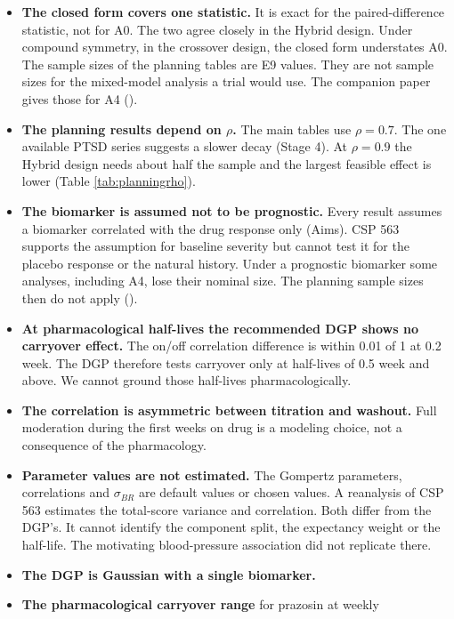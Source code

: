 \documentclass[
  11pt,
]{article}
\providecommand{\tightlist}{%
  \setlength{\itemsep}{0pt}\setlength{\parskip}{0pt}}
\begin{document}
\begin{itemize}
\tightlist
\item
  \textbf{The closed form covers one statistic.} It is exact for the
  paired-difference statistic, not for A0. The two agree closely in
  the Hybrid design. Under compound symmetry, in the crossover
  design, the closed form understates A0. The sample sizes of the
  planning tables are E9 values. They are not sample sizes for the mixed-model
  analysis a trial would use. The companion paper gives those for A4
  ().
\item
  \textbf{The planning results depend on \(\rho\).} The main tables use
  \(\rho = 0.7\). The one available PTSD series suggests a slower decay
  (Stage 4). At \(\rho = 0.9\) the Hybrid design needs about half the
  sample and the largest feasible effect is lower (Table
  \ref{tab:planningrho}).
\item
  \textbf{The biomarker is assumed not to be prognostic.} Every result
  assumes a biomarker correlated with the drug response only (Aims).
  CSP 563 supports the assumption for baseline severity but cannot
  test it for the placebo response or the natural history. Under a
  prognostic biomarker some analyses, including A4, lose their
  nominal size. The planning sample sizes then do not apply
  ().
\item
  \textbf{At pharmacological half-lives the recommended DGP shows no
  carryover effect.} The on/off correlation difference is within 0.01 of 1 at
  0.2 week. The DGP therefore tests carryover only at half-lives of
  0.5 week and above. We cannot ground those half-lives
  pharmacologically.
\item
  \textbf{The correlation is asymmetric between titration and washout.}
  Full moderation during the first weeks on drug is a modeling choice,
  not a consequence of the pharmacology.
\item
  \textbf{Parameter values are not estimated.} The Gompertz parameters,
  correlations and \(\sigma_{BR}\) are default values or chosen
  values. A reanalysis of CSP 563 estimates the total-score variance
  and correlation. Both differ from the DGP's. It cannot identify the
  component split, the expectancy weight or the half-life. The
  motivating blood-pressure association did not replicate there.
\item
  \textbf{The DGP is Gaussian with a single biomarker.}
\item
  \textbf{The pharmacological carryover range} for prazosin at weekly

\end{itemize}
\end{document}
